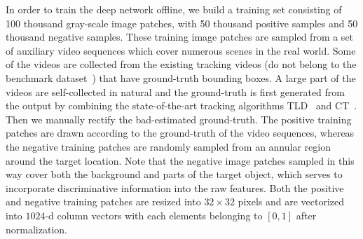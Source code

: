 \documentclass[preprint,12pt,review]{elsarticle}
\begin{document}
In order to train the deep network offline, we build a training set consisting of 100 thousand gray-scale image patches, with 50 thousand positive samples and 50 thousand negative samples.
%
These training image patches are sampled from a set of auxiliary video sequences which cover numerous scenes in the real world. Some of the videos are collected from the existing tracking videos (do not belong to the benchmark dataset~\cite{wu2013online}) that have ground-truth bounding boxes. A large part of the videos are self-collected in natural and the ground-truth is first generated from the output by combining the state-of-the-art tracking algorithms TLD~\cite{kalal2010pn} and CT~\cite{zhang2012real}. Then we manually rectify the bad-estimated ground-truth. 
%
The positive training patches are drawn according to the ground-truth of the video sequences, whereas the negative training patches are randomly sampled from an annular region around the target location.
%
Note that the negative image patches sampled in this way cover both the background and parts of the target object, which serves to incorporate discriminative information into the raw features.
%
%
Both the positive and negative training patches are resized into $32 \times 32$ pixels and are vectorized into $1024$-d column vectors with each elements belonging to $[0,1]$ after normalization.
%
%
%
%
%
%
\end{document}
